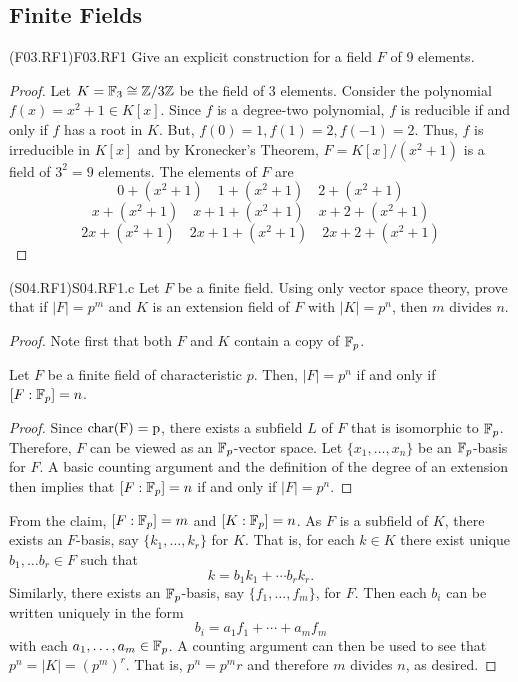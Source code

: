 \documentclass[../AlgebraQualSolutions.tex]{subfiles}
\begin{document}
\subsection{Finite Fields}

\begin{prob}{(F03.RF1)}{F03.RF1}
Give an explicit construction for a field $F$ of 9 elements.
\end{prob}
\begin{proof}
	Let $K = \mathbb{F}_3 \cong \mathbb{Z}/3\mathbb{Z}$ be the field of 3 elements. Consider the polynomial $f(x) = x^2 + 1 \in K[x]$. Since $f$ is a degree-two polynomial, $f$ is reducible if and only if $f$ has a root in $K$. But, $f(0) = 1, f(1) = 2, f(-1) = 2$. Thus, $f$ is irreducible in $K[x]$ and by Kronecker's Theorem, $F = K[x]/(x^2 + 1)$ is a field of $3^2 = 9$ elements. The elements of $F$ are
		\[0 + (x^2 + 1) \quad 1 + (x^2 + 1) \quad 2 + (x^2 + 1)\]
		\[x + (x^2 + 1) \quad x + 1 + (x^2 + 1) \quad x + 2 + (x^2 + 1)\]
		\[2x + (x^2 + 1) \quad 2x + 1 + (x^2 + 1) \quad 2x + 2 + (x^2 + 1)\]
\end{proof}

\begin{prob}{(S04.RF1)}{S04.RF1.c}
	Let $F$ be a finite field. Using only vector space theory, prove that if $|F| = p^m$ and $K$ is an extension field  of $F$ with $|K|=p^n$, then $m$ divides $n$.
\end{prob}

\begin{proof}
	Note first that both $F$ and $K$ contain a copy of $\mathbb{F}_p$.
		\begin{claim}
			Let $F$ be a finite field of characteristic $p$. Then, $|F|=p^n$ if and only if $[F:\mathbb{F}_p] = n$.

			\begin{proof}
				Since $\rm{char}(F) = p$, there exists a subfield $L$ of $F$ that is isomorphic to $\mathbb{F}_p$. Therefore, $F$ can be viewed as an $\mathbb{F}_p$-vector space. Let $\{x_1,\ldots, x_n\}$ be an $\mathbb{F}_p$-basis for $F$. A basic counting argument and the definition of the degree of an extension then implies that $[F:\mathbb{F}_p] = n$ if and only if $|F|=p^n$.
			\end{proof}
		\end{claim}

	From the claim, $[F:\mathbb{F}_p] = m$ and $[K:\mathbb{F}_p] = n$. As $F$ is a subfield of $K$, there exists an $F$-basis, say $\{k_1, \ldots, k_r\}$ for $K$. That is, for each $k \in K$ there exist unique $b_1,\ldots b_r \in F$ such that
		\[k = b_1k_1 + \cdots b_rk_r.\]
	Similarly, there exists an $\mathbb{F}_p$-basis, say $\{f_1,\ldots, f_m\}$, for $F$. Then each $b_i$ can be written uniquely in the form 	
		\[b_i = a_1f_1 + \cdots + a_mf_m\]
	with each $a_1,\ldots,a_m \in \mathbb{F}_p$. A counting argument can then be used to see that $p^n = |K| = \left(p^m\right)^r$. That is, $p^n = p^mr$ and therefore $m$ divides $n$, as desired.
\end{proof}
\end{document}
